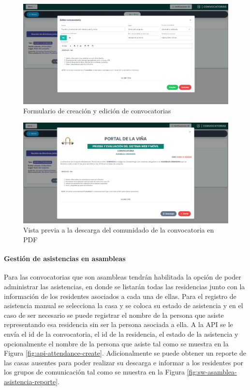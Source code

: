 \begin{figure}[H]
    \centering
    \includegraphics[width=1\textwidth]{resources/images/sw-convocatorias-form}
    \caption{Formulario de creación y edición de convocatorias}
    \label{fig:sw-convocatorias-formulario}
\end{figure}

\begin{figure}[H]
    \centering
    \includegraphics[width=1\textwidth]{resources/images/sw-convocatorias-comunicado}
    \caption{Vista previa a la descarga del comunidado de la convocatoria en PDF}
    \label{fig:sw-convocatorias-comunicado}
\end{figure}

\paragraph{Gestión de asistencias en asambleas}

Para las convocatorias que son asambleas tendrán habilitada la opción de poder administrar las asistencias, en donde se listarán todas las residencias junto con la información de los residentes asociados a cada una de ellas.
Para el registro de asistencia manual se selecciona la casa y se coloca su estado de asistencia y en el caso de ser necesario se puede registrar el nombre de la persona que asiste representando esa residencia sin ser la persona asociada a ella.
A la API se le envía el id de la convocatoria, el id de la residencia, el estado de la asistencia y opcionalmente el nombre de la persona que asiste tal como se muestra en la Figura \ref{fig:api-attendance-create}.
Adicionalmente se puede obtener un reporte de las casas ausentes para poder realizar su descarga e informar a los residentes por los grupos de comunicación tal como se muestra en la Figura \ref{fig:sw-asamblea-asistencia-reporte}.

